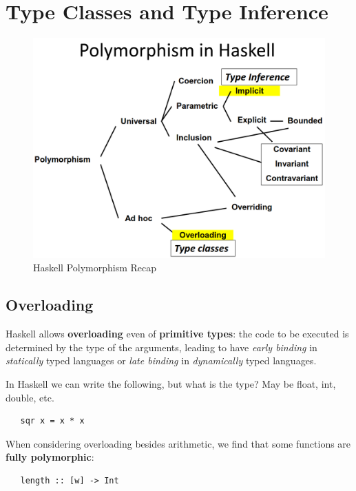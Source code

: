 \chapter{Type Classes and Type Inference}
\begin{figure}[htbp]
   \centering
   \includegraphics{images/haskell_polymorphism.png}
   \caption{Haskell Polymorphism Recap}
   \label{fig:haskell_polymorphism}
\end{figure}

\section{Overloading}
Haskell allows \textbf{overloading} even of \textbf{primitive types}:
the code to be executed is determined by the type of the arguments,
leading to have \textit{early binding} in \textit{statically} typed languages
or \textit{late binding} in \textit{dynamically} typed languages.

In Haskell we can write the following, but what is the type? May be float, int, double, etc.
\begin{lstlisting}
   sqr x = x * x
\end{lstlisting}


When considering overloading besides arithmetic, we find that some functions are \textbf{fully polymorphic}:
\begin{lstlisting}
   length :: [w] -> Int
\end{lstlisting}

